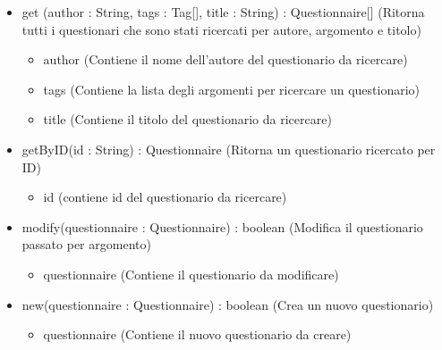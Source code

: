 \begin{description}
\begin{itemize}
\item get (author : String, tags  : Tag[], title : String) : Questionnaire[] (Ritorna tutti i questionari che sono stati ricercati per autore, argomento e titolo)\begin{itemize}
\item author (Contiene il nome dell'autore del questionario da ricercare)
\item tags  (Contiene la lista degli argomenti per ricercare un questionario)
\item title (Contiene il titolo del questionario da ricercare)
\end{itemize}

\item getByID(id : String) : Questionnaire (Ritorna un questionario ricercato per ID)\begin{itemize}
\item id (contiene id del questionario da ricercare)
\end{itemize}

\item modify(questionnaire : Questionnaire) : boolean (Modifica il questionario passato per argomento)\begin{itemize}
\item questionnaire (Contiene il questionario da modificare)
\end{itemize}

\item new(questionnaire : Questionnaire) : boolean (Crea un nuovo questionario)\begin{itemize}
\item questionnaire (Contiene il nuovo questionario da creare)
\end{itemize}

\end{itemize}

\end{description}

\vspace{0.5cm}
